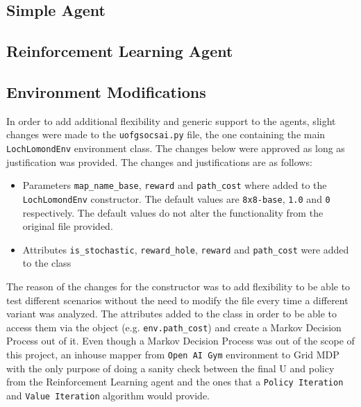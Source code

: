 \documentclass[11pt,]{article}
\providecommand{\tightlist}{%
  \setlength{\itemsep}{0pt}\setlength{\parskip}{0pt}}
\begin{document}
\subsection{Simple Agent}\label{simple-agent}

\subsection{Reinforcement Learning
Agent}\label{reinforcement-learning-agent}

\subsection{Environment Modifications}\label{environment-modifications}

In order to add additional flexibility and generic support to the
agents, slight changes were made to the \texttt{uofgsocsai.py} file, the
one containing the main \texttt{LochLomondEnv} environment class. The
changes below were approved as long as justification was provided. The
changes and justifications are as follows:

\begin{itemize}
\tightlist
\item
  Parameters \texttt{map\_name\_base}, \texttt{reward} and
  \texttt{path\_cost} where added to the \texttt{LochLomondEnv}
  constructor. The default values are \texttt{8x8-base}, \texttt{1.0}
  and \texttt{0} respectively. The default values do not alter the
  functionality from the original file provided.
\item
  Attributes \texttt{is\_stochastic}, \texttt{reward\_hole},
  \texttt{reward} and \texttt{path\_cost} were added to the class
\end{itemize}

The reason of the changes for the constructor was to add flexibility to
be able to test different scenarios without the need to modify the file
every time a different variant was analyzed. The attributes added to the
class in order to be able to access them via the object (e.g.
\texttt{env.path\_cost}) and create a Markov Decision Process out of it.
Even though a Markov Decision Process was out of the scope of this
project, an inhouse mapper from \texttt{Open\ AI\ Gym} environment to
Grid MDP with the only purpose of doing a sanity check between the final
U and policy from the Reinforcement Learning agent and the ones that a
\texttt{Policy\ Iteration} and \texttt{Value\ Iteration} algorithm would
provide.
\end{document}
